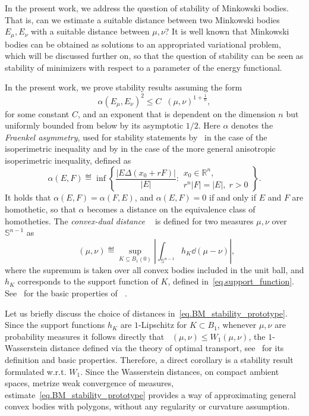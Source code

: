 \documentclass[a4paper, 10pt, twoside]{amsart}
\numberwithin{equation}{section}
\theoremstyle{plain}
\theoremstyle{definition}
\DeclareMathOperator{\dc}{\mathrm{d}_\mathrm{C}}
\begin{document}
In the present work, we address the question of stability of Minkowski bodies. That is, can we estimate a suitable distance between two Minkowski bodies $E_\mu, E_\nu$ with a suitable distance between $\mu,\nu$? It is well known that Minkowski bodies can be obtained as solutions to an appropriated variational problem, which will be discussed further on, so that the question of stability can be seen as stability of minimizers with respect to a parameter of the energy functional. 

In the present work, we prove stability results assuming the form
\begin{equation}\label{eq.BM_stability_prototype}
    {\alpha(E_\mu, E_\nu)}^2 \leq C {\dc(\mu,\nu)}^{1 + \frac{1}{n}},
\end{equation}
for some constant $C$, and an exponent that is dependent on the dimension $n$ but uniformly bounded from below by its asymptotic $1/2$. Here $\alpha$ denotes the \textit{Fraenkel asymmetry}, used for stability statements by~\cite{fusco2008sharp} in the case of the isoperimetric inequality and by \cite{figalli2010stability} in the case of the more general anisotropic isoperimetric inequality, defined  as 
\begin{equation}\label{eq.fraenkel_asymmetry}
    \alpha(E,F) 
    \eqdef 
    \inf
    \left\{
        \frac{|E \Delta (x_0 + rF)|}{|E|}: 
        \substack{
            \displaystyle
            x_0 \in \mathbb{R}^n,\\ 
            \displaystyle
            r^n|F| = |E|,\; r>0
        }
    \right\}.
\end{equation}
It holds that $\alpha(E,F)=\alpha(F,E)$, and $\alpha(E,F)=0$ if and only if $E$ and $F$ are homothetic, so that $\alpha$ becomes a distance on the equivalence class of homotheties. The \textit{convex-dual distance} $\dc$ is defined for two measures $\mu,\nu$ over $\mathbb{S}^{n-1}$ as 
\begin{equation}\label{eq.convex_dual_distance}
    \dc(\mu,\nu) 
    \eqdef 
    \sup_{K \subseteq B_1(0)} 
    \left|
        \int_{\mathbb{S}^{n-1}} h_K \dd (\mu-\nu)
    \right|,
\end{equation}
where the supremum is taken over all convex bodies included in the unit ball, and $h_K$ corresponds to the support function of $K$, defined in~\eqref{eq.support_function}. See~\cite{abdallah2015reconstruction} for the basic properties of $\dc$. 

Let us briefly discuss the choice of distances in~\eqref{eq.BM_stability_prototype}. Since the support functions $h_K$ are $1$-Lipschitz for $K \subset B_1$, whenever $\mu,\nu$ are probability measures it follows directly that $\dc(\mu,\nu) \le W_1(\mu,\nu)$, the $1$-Wasserstein distance defined via the theory of optimal transport, see~\cite{santambrogio2015optimal,ambrosio2021lectures} for its definition and basic properties. Therefore, a direct corollary is a stability result formulated w.r.t. $W_1$. Since the Wasserstein distances, on compact ambient spaces, metrize weak convergence of measures, estimate~\eqref{eq.BM_stability_prototype} provides a way of approximating general convex bodies with polygons, without any regularity or curvature assumption. 
\end{document}
